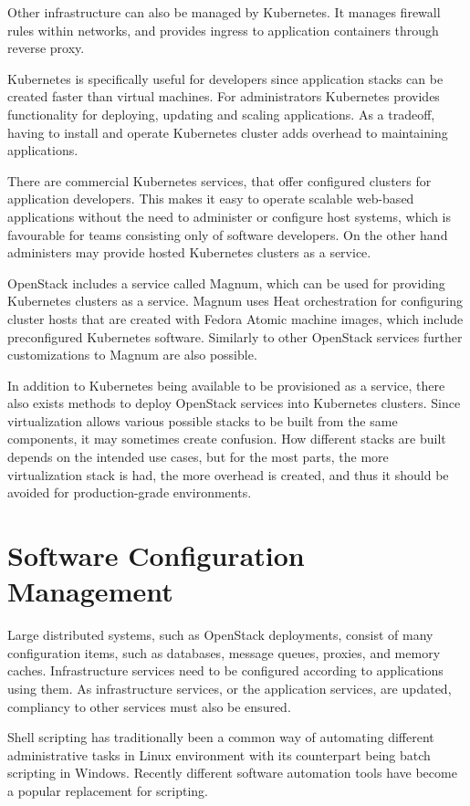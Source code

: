 \documentclass[officiallayout]{tktla}
\begin{document}
Other infrastructure can also be managed by Kubernetes. It manages firewall
rules within networks, and provides ingress to application containers through
reverse proxy.

Kubernetes is specifically useful for developers since application stacks can
be created faster than virtual machines. For administrators Kubernetes provides
functionality for deploying, updating and scaling applications. As a tradeoff,
having to install and operate Kubernetes cluster adds overhead to maintaining
applications.

There are commercial Kubernetes services, that offer configured clusters for
application developers. This makes it easy to operate scalable web-based
applications without the need to administer or configure host systems, which is
favourable for teams consisting only of software developers. On the other hand
administers may provide hosted Kubernetes clusters as a service.

OpenStack includes a service called Magnum, which can be used for providing
Kubernetes clusters as a service. Magnum uses Heat orchestration for
configuring cluster hosts that are created with Fedora Atomic machine images,
which include preconfigured Kubernetes software. Similarly to other OpenStack
services further customizations to Magnum are also possible.

In addition to Kubernetes being available to be provisioned as a service, there
also exists methods to deploy OpenStack services into Kubernetes clusters.
Since virtualization allows various possible stacks to be built from the same
components, it may sometimes create confusion. How different stacks are built
depends on the intended use cases, but for the most parts, the more
virtualization stack is had, the more overhead is created, and thus it should
be avoided for production-grade environments.

\section{Software Configuration Management}

Large distributed systems, such as OpenStack deployments, consist of many
configuration items, such as databases, message queues, proxies, and memory
caches. Infrastructure services need to be configured according to applications
using them. As infrastructure services, or the application services, are
updated, compliancy to other services must also be ensured.

Shell scripting has traditionally been a common way of automating different
administrative tasks in Linux environment with its counterpart being batch
scripting in Windows. Recently different software automation tools have become
a popular replacement for scripting.
\end{document}
